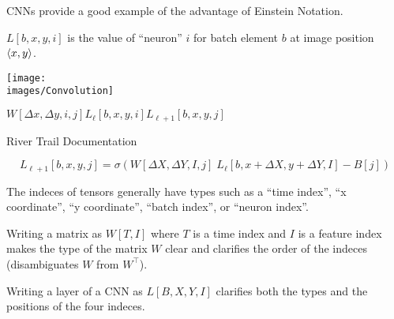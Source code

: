 {


CNNs provide a good example of the advantage of Einstein Notation.

\vfill
{\color{red} $L[b,x,y,i]$} is the value of ``neuron'' $i$ for batch element $b$ at image position ${\mbox{$\langle x,y\rangle$}}$.

\centerline{\texttt{[image: \\images/Convolution]}}
\centerline{$W[\Delta x,\Delta y,i,j]$\hspace{6ex}$L_{{\ell}}[b,x,y,i]$\hspace{6ex}$L_{{\ell+1}}[b,x,y,j]$}
\centerline{\large River Trail Documentation}

$$L_{{\ell+1}}[b,x,y,j] = \sigma\left(W[\Delta X, \Delta Y, I,j]\; L_{{\ell}}[b,x + \Delta X, y + \Delta Y, I] - B[j]\right)$$


The indeces of tensors generally have types such as a ``time index'', ``x coordinate'', ``y coordinate'', ``batch index'', or ``neuron index''.

\vfill
Writing a matrix as $W[T,I]$ where $T$ is a time index and $I$ is a feature index makes the type of the matrix $W$ clear and clarifies
the order of the indeces (disambiguates $W$ from $W^\top$).

\vfill
Writing a layer of a CNN as $L[B,X,Y,I]$ clarifies both the types and the positions of the four indeces.

}


